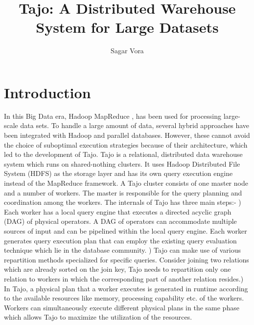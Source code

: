 \documentclass[9pt,twocolumn,twoside]{styles/osajnl}
\title{Tajo: A Distributed Warehouse System for Large Datasets}
\author[1]{Sagar Vora}
\affil[1]{School of Informatics and Computing, Bloomington, IN 47408, U.S.A.}
\begin{document}
\maketitle

\section{Introduction}
In this Big Data era, Hadoop MapReduce
\cite{www-apache-hadoop}\cite{mapreduce-article}, has been used for
processing large-scale data sets. To handle a large amount of data,
several hybrid approaches have been integrated with Hadoop and
parallel databases. However, these cannot avoid the choice of
suboptimal execution strategies because of their architecture, which
led to the development of Tajo. Tajo \cite{www-apache-tajo} is a
relational, distributed data warehouse system which runs on
shared-nothing clusters. It uses Hadoop Distributed File System (HDFS)
as the storage layer and has its own query execution engine instead of
the MapReduce framework. A Tajo cluster consists of one master node
and a number of workers. The master is responsible for the query
planning and coordination among the workers. \newline \newline The
internals of Tajo has three main steps:- ) Each worker has a
local query engine that executes a directed acyclic graph (DAG) of
physical operators. A DAG of operators can accommodate multiple
sources of input and can be pipelined within the local query
engine. Each worker generates query execution plan that can employ the
existing query evaluation technique \cite{query-evaluation-article}
\cite{query-processing-article} which lie in the database
community. ) Tajo can make use of various repartition methods
specialized for specific queries. Consider joining two relations which
are already sorted on the join key, Tajo needs to repartition only one
relation to workers in which the corresponding part of another
relation resides.) In Tajo, a physical plan that a worker
executes is generated in runtime according to the available resources
like memory, processing capability etc. of the workers. Workers can
simultaneously execute different physical plans in the same phase
which allows Tajo to maximize the utilization of the resources.
\end{document}
